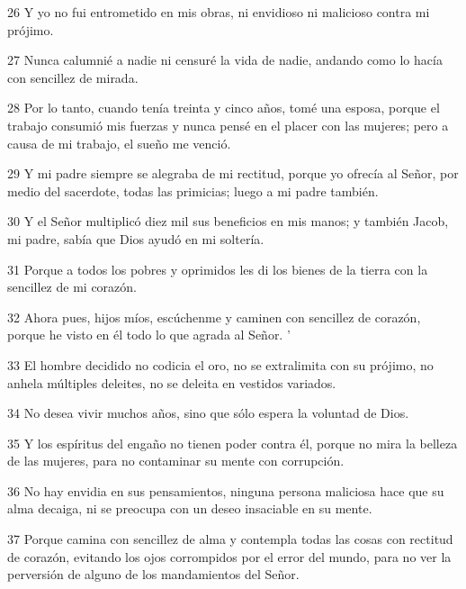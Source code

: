 \par 26 Y yo no fui entrometido en mis obras, ni envidioso ni malicioso contra mi prójimo.

\par 27 Nunca calumnié a nadie ni censuré la vida de nadie, andando como lo hacía con sencillez de mirada.

\par 28 Por lo tanto, cuando tenía treinta y cinco años, tomé una esposa, porque el trabajo consumió mis fuerzas y nunca pensé en el placer con las mujeres; pero a causa de mi trabajo, el sueño me venció.

\par 29 Y mi padre siempre se alegraba de mi rectitud, porque yo ofrecía al Señor, por medio del sacerdote, todas las primicias; luego a mi padre también.

\par 30 Y el Señor multiplicó diez mil sus beneficios en mis manos; y también Jacob, mi padre, sabía que Dios ayudó en mi soltería.

\par 31 Porque a todos los pobres y oprimidos les di los bienes de la tierra con la sencillez de mi corazón.

\par 32 Ahora pues, hijos míos, escúchenme y caminen con sencillez de corazón, porque he visto en él todo lo que agrada al Señor. '

\par 33 El hombre decidido no codicia el oro, no se extralimita con su prójimo, no anhela múltiples deleites, no se deleita en vestidos variados.

\par 34 No desea vivir muchos años, sino que sólo espera la voluntad de Dios.

\par 35 Y los espíritus del engaño no tienen poder contra él, porque no mira la belleza de las mujeres, para no contaminar su mente con corrupción.

\par 36 No hay envidia en sus pensamientos, ninguna persona maliciosa hace que su alma decaiga, ni se preocupa con un deseo insaciable en su mente.

\par 37 Porque camina con sencillez de alma y contempla todas las cosas con rectitud de corazón, evitando los ojos corrompidos por el error del mundo, para no ver la perversión de alguno de los mandamientos del Señor.

